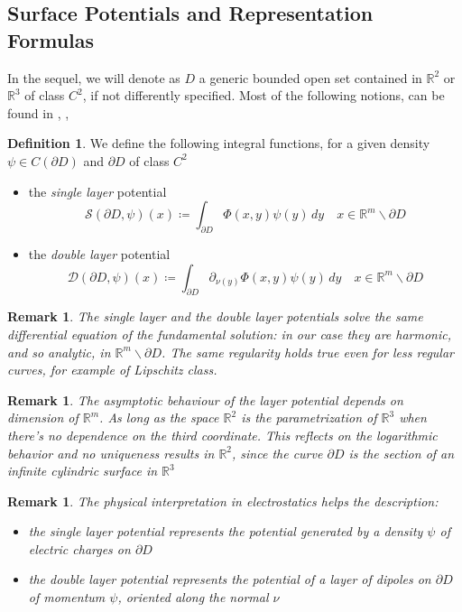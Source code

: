 \documentclass[10pt, a4paper, twoside, openright]{book}
\theoremstyle{definition}
\newtheorem{definition}[subsection]{Definition}
\theoremstyle{plain}
\theoremstyle{plain}
\theoremstyle{plain}
\theoremstyle{plain}
\newtheorem{remark}[subsection]{Remark}
\theoremstyle{plain}
\theoremstyle{plain}
\theoremstyle{plain}
\theoremstyle{plain}
\begin{document}
\subsection{Surface Potentials and Representation Formulas}
In the sequel, we will denote as $D$ a generic bounded open set contained in $\mathbb{R}^2$ or $\mathbb{R}^3$ of class $C^2$, if not differently specified.
Most of the following notions, can be found in \cite{kirsch:book}, \cite{colton-kress:book}, \cite{salsa:book}
\begin{definition}
 We define the following integral functions, for a given density $\psi\in C(\partial D)$ and $\partial D$ of class $C^2$
 \begin{itemize}
  \item the \emph{single layer} potential
   \begin{equation}
    \mathcal{S}(\partial D,\psi)(x)\coloneqq \int_{\partial D} \Phi(x, y)\psi(y)\, dy\quad x\in\mathbb{R}^m \backslash\partial D 
   \end{equation}
  \item the \emph{double layer} potential
   \begin{equation}
    \mathcal{D}(\partial D,\psi)(x)\coloneqq \int_{\partial D} \partial_{\nu(y)}\Phi(x, y)\psi(y)\, dy\quad x\in\mathbb{R}^m \backslash\partial D 
   \end{equation}
 \end{itemize}
\end{definition}
\begin{remark}
The single layer and the double layer potentials solve the same differential equation of the fundamental solution: in our case they are harmonic, and so analytic, in $\mathbb{R}^m\backslash \partial D$. The same regularity holds true even for less regular curves, for example of Lipschitz class.
\end{remark}
\begin{remark}
\label{rem:dimension}
The asymptotic behaviour of the layer potential depends on dimension of $\mathbb{R}^m$.
As long as the space $\mathbb{R}^2$ is the parametrization of $\mathbb{R}^3$ when there's no dependence on the third coordinate. This reflects on the logarithmic behavior and no uniqueness results in $\mathbb{R}^2$, since the curve $\partial D$ is the section of an infinite cylindric surface in $\mathbb{R}^3$ 
\end{remark}
\begin{remark}
The physical interpretation in electrostatics helps the description:
\begin{itemize}
 \item the single layer potential represents the potential generated by a density $\psi$ of electric charges on $\partial D$
 \item the double layer potential represents the potential of a layer of dipoles on $\partial D$ of momentum $\psi$, oriented along the normal $\nu$
\end{itemize}
\end{remark}
\end{document}
